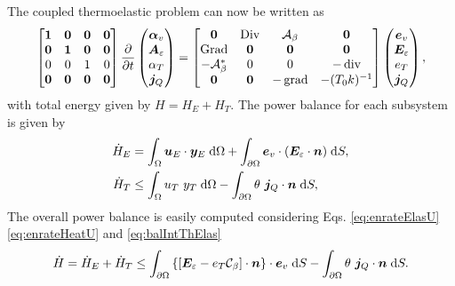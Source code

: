 The coupled thermoelastic problem can now be written as
\begin{equation}\label{eq:phsysElasHeat}
\begin{bmatrix}
\bm{1} & \bm{0} & \bm{0} & \bm{0}\\
\bm{0} & \bm{1} & \bm{0} & \bm{0}\\
0 & 0 & 1 & 0\\
\bm{0} & \bm{0} & \bm{0} & \bm{0}\\
\end{bmatrix}
\diffp{}{t}
\begin{pmatrix}
\bm{\alpha}_v \\
\bm{A}_\varepsilon \\
{\alpha}_T \\
\bm{j}_Q \\
\end{pmatrix} = 
\begin{bmatrix}
\bm{0} & \Div & \mathcal{A}_\beta & \bm{0}\\
\Grad & \bm{0} & \bm{0} & \bm{0} \\
- \mathcal{A}_\beta^* & 0 & 0 & -\div \\
\bm{0} & \bm{0} & -\grad & - (T_0 k)^{-1} \\
\end{bmatrix}
\begin{pmatrix}
\bm{e}_v \\
\bm{E}_\varepsilon \\
{e}_T \\
\bm{j}_Q \\
\end{pmatrix},
\end{equation}
with total energy given by $H=H_E + H_T$. The power balance for each subsystem is given by 
\begin{align}
\dot{H}_E &= \int_\Omega \bm{u}_E \cdot \bm{y}_E \d\Omega + \int_{\partial\Omega} \bm{e}_v \cdot (\bm{E}_\varepsilon \cdot \bm{n}) \d{S}, \label{eq:enrateElasU} \\
\dot{H}_T &\le \int_\Omega u_T \ y_T \d\Omega - \int_{\partial\Omega} \theta \ \bm{j}_Q \cdot \bm{n} \d{S}, \label{eq:enrateHeatU}
\end{align}
The overall power balance is easily computed considering Eqs. \eqref{eq:enrateElasU} \eqref{eq:enrateHeatU} and \eqref{eq:balIntThElas}
\begin{equation}\label{eq:enrateIntThElas}
\begin{aligned}
\dot{H} = \dot{H}_E + \dot{H}_T \le \int_{\partial \Omega} \left\{\left[\bm{E}_\varepsilon - e_T \mathcal{C}_\beta \right] \cdot \bm{n}\right\}  \cdot \bm{e}_v  \d{S} - \int_{\partial\Omega} \theta \ \bm{j}_Q \cdot \bm{n} \d{S}.
\end{aligned}
\end{equation}
